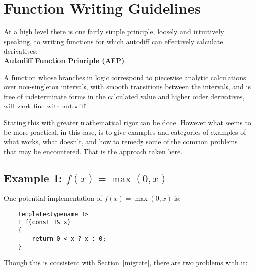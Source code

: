 \documentclass{article}
\begin{document}
\section{Function Writing Guidelines}

At a high level there is one fairly simple principle, loosely and intuitively speaking, to writing functions for
which autodiff can effectively calculate derivatives: \\

{\bf Autodiff Function Principle (AFP)}
\begin{displayquote}
A function whose branches in logic correspond to piecewise analytic calculations over non-singleton intervals,
with smooth transitions between the intervals, and is free of indeterminate forms in the calculated value and
higher order derivatives, will work fine with autodiff.
\end{displayquote}
Stating this with greater mathematical rigor can be done. However what seems to be more practical, in this
case, is to give examples and categories of examples of what works, what doesn't, and how to remedy some of the
common problems that may be encountered. That is the approach taken here.

\subsection{Example 1: $f(x)=\max(0,x)$}

One potential implementation of $f(x)=\max(0,x)$ is:

\begin{verbatim}
    template<typename T>
    T f(const T& x)
    {
        return 0 < x ? x : 0;
    }
\end{verbatim}
Though this is consistent with Section~\ref{migrate}, there are two problems with it:
\end{document}
